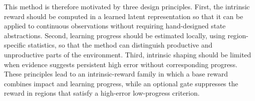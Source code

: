 This method is therefore motivated by three design principles.
First, the intrinsic reward should be computed in a learned latent representation so that it can be applied to continuous observations without requiring hand-designed state abstractions.
Second, learning progress should be estimated locally, using region-specific statistics, so that the method can distinguish productive and unproductive parts of the environment.
Third, intrinsic shaping should be limited when evidence suggests persistent high error without corresponding progress.
These principles lead to an intrinsic-reward family in which a base reward combines impact and learning progress, while an optional gate suppresses the reward in regions that satisfy a high-error low-progress criterion.
